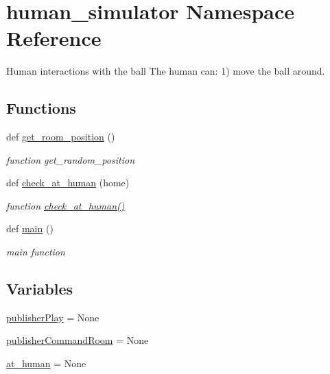 \hypertarget{namespacehuman__simulator}{}\section{human\+\_\+simulator Namespace Reference}
\label{namespacehuman__simulator}


Human interactions with the ball The human can\+: 1) move the ball around.  


\subsection*{Functions}
\begin{DoxyCompactItemize}
\item 
def \hyperlink{namespacehuman__simulator_aaf8bac689897648e75aeb3f194e6cde1}{get\+\_\+room\+\_\+position} ()
\begin{DoxyCompactList}\small\item\em function get\+\_\+random\+\_\+position \end{DoxyCompactList}\item 
def \hyperlink{namespacehuman__simulator_a1ffee3228c32e64a7d458b86b00e8a55}{check\+\_\+at\+\_\+human} (home)
\begin{DoxyCompactList}\small\item\em function \hyperlink{namespacehuman__simulator_a1ffee3228c32e64a7d458b86b00e8a55}{check\+\_\+at\+\_\+human()} \end{DoxyCompactList}\item 
def \hyperlink{namespacehuman__simulator_adb91dbb164188ff85ca65a1c0380a16a}{main} ()
\begin{DoxyCompactList}\small\item\em main function \end{DoxyCompactList}\end{DoxyCompactItemize}
\subsection*{Variables}
\begin{DoxyCompactItemize}
\item 
\hyperlink{namespacehuman__simulator_a7ab8519bbc715b4fc0be38fca89bb1ea}{publisher\+Play} = None
\item 
\hyperlink{namespacehuman__simulator_abf72cf6c41334f67acbd3a64400611b9}{publisher\+Command\+Room} = None
\item 
\hyperlink{namespacehuman__simulator_a1d29f5a2849453421e867b733b0d9f3f}{at\+\_\+human} = None
\end{DoxyCompactItemize}



